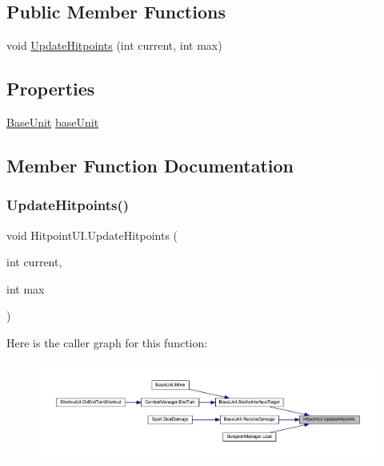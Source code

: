 \subsection*{Public Member Functions}
\begin{DoxyCompactItemize}
\item 
void \mbox{\hyperlink{class_hitpoint_u_i_a276f8fb6a38204f4155f32c48c6322af}{Update\+Hitpoints}} (int current, int max)
\end{DoxyCompactItemize}
\subsection*{Properties}
\begin{DoxyCompactItemize}
\item 
\mbox{\hyperlink{class_base_unit}{Base\+Unit}} \mbox{\hyperlink{class_hitpoint_u_i_a6dfd0f75896f8f70dc7f2dc0ff34fb42}{base\+Unit}}
\end{DoxyCompactItemize}


\subsection{Member Function Documentation}
\mbox{\label{class_hitpoint_u_i_a276f8fb6a38204f4155f32c48c6322af}} 
\subsubsection{\texorpdfstring{UpdateHitpoints()}{UpdateHitpoints()}}
{\footnotesize\ttfamily void Hitpoint\+U\+I.\+Update\+Hitpoints (\begin{DoxyParamCaption}\item[{int}]{current,  }\item[{int}]{max }\end{DoxyParamCaption})}

Here is the caller graph for this function\+:\nopagebreak
\begin{figure}[H]
\begin{center}
\leavevmode
\includegraphics[width=350pt]{class_hitpoint_u_i_a276f8fb6a38204f4155f32c48c6322af_icgraph}
\end{center}
\end{figure}


